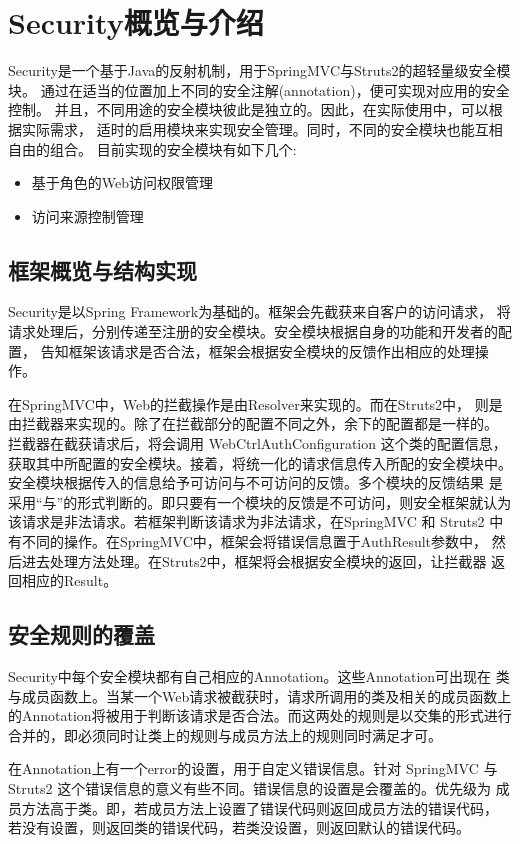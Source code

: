 
\section{Security概览与介绍}

Security是一个基于Java的反射机制，用于SpringMVC与Struts2的超轻量级安全模块。
通过在适当的位置加上不同的安全注解(annotation)，便可实现对应用的安全控制。
并且，不同用途的安全模块彼此是独立的。因此，在实际使用中，可以根据实际需求，
适时的启用模块来实现安全管理。同时，不同的安全模块也能互相自由的组合。
目前实现的安全模块有如下几个:
\begin{itemize}
\item 基于角色的Web访问权限管理
\item 访问来源控制管理
\end{itemize}

\subsection{框架概览与结构实现}
Security是以Spring Framework为基础的。框架会先截获来自客户的访问请求，
将请求处理后，分别传递至注册的安全模块。安全模块根据自身的功能和开发者的配置，
告知框架该请求是否合法，框架会根据安全模块的反馈作出相应的处理操作。

在SpringMVC中，Web的拦截操作是由Resolver来实现的。而在Struts2中，
则是由拦截器来实现的。除了在拦截部分的配置不同之外，余下的配置都是一样的。
拦截器在截获请求后，将会调用 WebCtrlAuthConfiguration 这个类的配置信息，
获取其中所配置的安全模块。接着，将统一化的请求信息传入所配的安全模块中。
安全模块根据传入的信息给予可访问与不可访问的反馈。多个模块的反馈结果
是采用``与''的形式判断的。即只要有一个模块的反馈是不可访问，则安全框架就认为
该请求是非法请求。若框架判断该请求为非法请求，在SpringMVC 和 Struts2
中有不同的操作。在SpringMVC中，框架会将错误信息置于AuthResult参数中，
然后进去处理方法处理。在Struts2中，框架将会根据安全模块的返回，让拦截器
返回相应的Result。

\subsection{安全规则的覆盖}
Security中每个安全模块都有自己相应的Annotation。这些Annotation可出现在
类与成员函数上。当某一个Web请求被截获时，请求所调用的类及相关的成员函数上
的Annotation将被用于判断该请求是否合法。而这两处的规则是以交集的形式进行
合并的，即必须同时让类上的规则与成员方法上的规则同时满足才可。

在Annotation上有一个error的设置，用于自定义错误信息。针对 SpringMVC 与 
Struts2 这个错误信息的意义有些不同。错误信息的设置是会覆盖的。优先级为
成员方法高于类。即，若成员方法上设置了错误代码则返回成员方法的错误代码，
若没有设置，则返回类的错误代码，若类没设置，则返回默认的错误代码。

